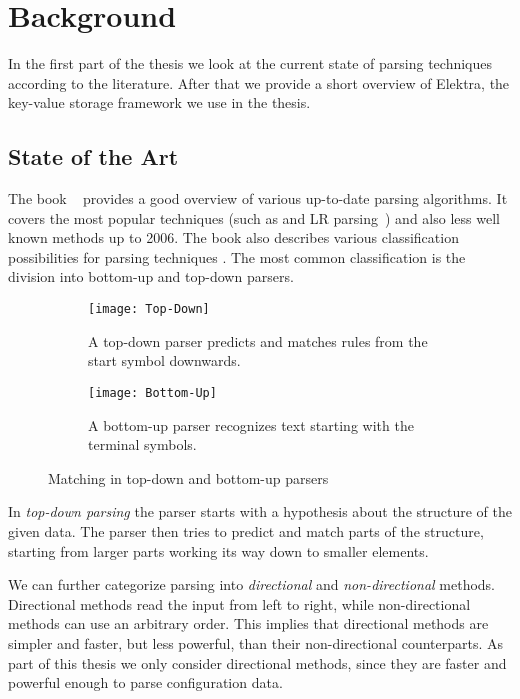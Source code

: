 \chapter{Background}

In the first part of the thesis we look at the current state of parsing techniques according to the literature. After that we provide a short overview of Elektra, the key-value storage framework we use in the thesis.

\section{State of the Art}
\label{sec:state_of_the_art}

The book ~\cite{grune2008parsing} provides a good overview of various up-to-date parsing algorithms. It covers the most popular techniques (such as  and LR parsing~\cite{knuth1965translation}) and also less well known methods up to 2006. The book also describes various classification possibilities for parsing techniques \cite[p. 85]{grune2008parsing}. The most common classification is the division into bottom-up and top-down parsers.

\begin{figure}[H]
  \centering
  \begin{subfigure}[t]{.25\textwidth}
    \texttt{[image: Top-Down]}
    \caption{A top-down parser predicts and matches rules from the start symbol downwards.}
  \end{subfigure}
  \qquad
  \begin{subfigure}[t]{.25\textwidth}
    \texttt{[image: Bottom-Up]}
    \caption{A bottom-up parser recognizes text starting with the terminal symbols.}
  \end{subfigure}
  \caption{Matching in top-down and bottom-up parsers}
\end{figure}

In \emph{top-down parsing} the parser starts with a hypothesis about the structure of the given data. The parser then tries to predict and match parts of the structure, starting from larger parts working its way down to smaller elements.

We can further categorize parsing into \emph{directional} and \emph{non-directional} methods. Directional methods read the input from left to right, while non-directional methods can use an arbitrary order. This implies that directional methods are simpler and faster, but less powerful, than their non-directional counterparts. As part of this thesis we only consider directional methods, since they are faster and powerful enough to parse configuration data.

